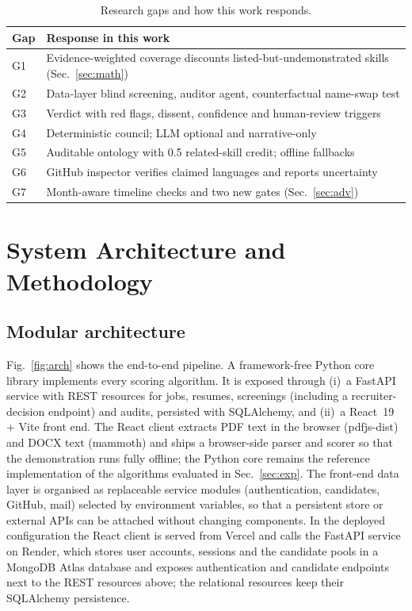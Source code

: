 \documentclass[conference]{IEEEtran}
\begin{document}
\begin{table}[t]
\caption{Research gaps and how this work responds.}
\label{tab:gaps}
\centering
\footnotesize
\renewcommand{\arraystretch}{1.1}
\begin{tabular}{@{}lp{6.1cm}@{}}
\toprule
Gap & Response in this work \\
\midrule
G1 & Evidence-weighted coverage discounts listed-but-undemonstrated skills (Sec.~\ref{sec:math}) \\
G2 & Data-layer blind screening, auditor agent, counterfactual name-swap test \\
G3 & Verdict with red flags, dissent, confidence and human-review triggers \\
G4 & Deterministic council; LLM optional and narrative-only \\
G5 & Auditable ontology with 0.5 related-skill credit; offline fallbacks \\
G6 & GitHub inspector verifies claimed languages and reports uncertainty \\
G7 & Month-aware timeline checks and two new gates (Sec.~\ref{sec:adv}) \\
\bottomrule
\end{tabular}
\end{table}

\section{System Architecture and Methodology}
\label{sec:arch}

\subsection{Modular architecture}
Fig.~\ref{fig:arch} shows the end-to-end pipeline. A framework-free Python core library implements every scoring algorithm. It is exposed through (i)~a FastAPI service with REST resources for jobs, resumes, screenings (including a recruiter-decision endpoint) and audits, persisted with SQLAlchemy, and (ii)~a React~19 + Vite front end. The React client extracts PDF text in the browser (pdfjs-dist) and DOCX text (mammoth) and ships a browser-side parser and scorer so that the demonstration runs fully offline; the Python core remains the reference implementation of the algorithms evaluated in Sec.~\ref{sec:exp}. The front-end data layer is organised as replaceable service modules (authentication, candidates, GitHub, mail) selected by environment variables, so that a persistent store or external APIs can be attached without changing components. In the deployed configuration the React client is served from Vercel and calls the FastAPI service on Render, which stores user accounts, sessions and the candidate pools in a MongoDB Atlas database and exposes authentication and candidate endpoints next to the REST resources above; the relational resources keep their SQLAlchemy persistence.
\end{document}
